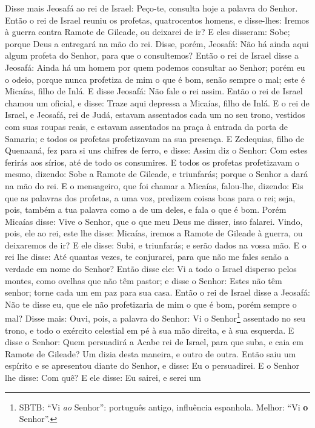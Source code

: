 Disse mais Jeosafá ao rei de Israel: Peço-te, consulta hoje a
palavra do Senhor. Então o rei de Israel reuniu os profetas,
quatrocentos homens, e disse-lhes: Iremos à guerra contra Ramote de
Gileade, ou deixarei de ir? E eles disseram: Sobe; porque Deus a
entregará na mão do rei. Disse, porém, Jeosafá: Não há ainda
aqui algum profeta do Senhor, para que o consultemos? Então o
rei de Israel disse a Jeosafá: Ainda há um homem por quem podemos
consultar ao Senhor; porém eu o odeio, porque nunca profetiza de mim
o que é bom, senão sempre o mal; este é Micaías, filho de Inlá. E
disse Jeosafá: Não fale o rei assim. Então o rei de Israel
chamou um oficial, e disse: Traze aqui depressa a Micaías, filho de
Inlá. E o rei de Israel, e Jeosafá, rei de Judá, estavam
assentados cada um no seu trono, vestidos com suas roupas reais, e
estavam assentados na praça à entrada da porta de Samaria; e todos
os profetas profetizavam na sua presença. E Zedequias, filho
de Quenaaná, fez para si uns chifres de ferro, e disse: Assim diz o
Senhor: Com estes ferirás aos sírios, até de todo os consumires.
E todos os profetas profetizavam o mesmo, dizendo: Sobe a
Ramote de Gileade, e triunfarás; porque o Senhor a dará na mão do
rei. E o mensageiro, que foi chamar a Micaías, falou-lhe,
dizendo: Eis que as palavras dos profetas, a uma voz, predizem
coisas boas para o rei; seja, pois, também a tua palavra como a de
um deles, e fala o que é bom. Porém Micaías disse: Vive o
Senhor, que o que meu Deus me disser, isso falarei. Vindo,
pois, ele ao rei, este lhe disse: Micaías, iremos a Ramote de
Gileade à guerra, ou deixaremos de ir? E ele disse: Subi, e
triunfarás; e serão dados na vossa mão. E o rei lhe disse:
Até quantas vezes, te conjurarei, para que não me fales senão a
verdade em nome do Senhor? Então disse ele: Vi a todo o
Israel disperso pelos montes, como ovelhas que não têm pastor; e
disse o Senhor: Estes não têm senhor; torne cada um em paz para sua
casa. Então o rei de Israel disse a Jeosafá: Não te disse eu,
que ele não profetizaria de mim o que é bom, porém sempre o mal?
Disse mais: Ouvi, pois, a palavra do Senhor: Vi o
Senhor\footnote{SBTB: ``Vi \emph{ao} Senhor'': português antigo,
influência espanhola. Melhor: ``Vi \textbf{o} Senhor''.} assentado
no seu trono, e todo o exército celestial em pé à sua mão direita, e
à sua esquerda. E disse o Senhor: Quem persuadirá a Acabe rei
de Israel, para que suba, e caia em Ramote de Gileade? Um dizia
desta maneira, e outro de outra. Então saiu um espírito e se
apresentou diante do Senhor, e disse: Eu o persuadirei. E o Senhor
lhe disse: Com quê? E ele disse: Eu sairei, e serei um
